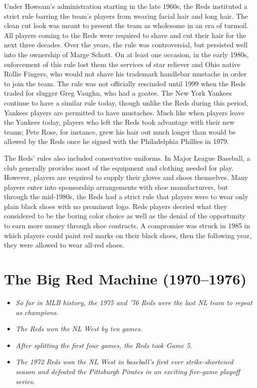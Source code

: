 Under Howsam's administration starting in the late 1960s, the Reds
instituted a strict rule barring the team's players from wearing facial
hair and long hair. The clean cut look was meant to present the team as
wholesome in an era of turmoil. All players coming to the Reds were
required to shave and cut their hair for the next three decades. Over
the years, the rule was controversial, but persisted well into the
ownership of Marge Schott. On at least one occasion, in the early 1980s,
enforcement of this rule lost them the services of star reliever and
Ohio native Rollie Fingers, who would not shave his trademark handlebar
mustache in order to join the team. The rule was not officially
rescinded until 1999 when the Reds traded for slugger Greg Vaughn, who
had a goatee. The New York Yankees continue to have a similar rule
today, though unlike the Reds during this period, Yankees players are
permitted to have mustaches. Much like when players leave the Yankees
today, players who left the Reds took advantage with their new teams;
Pete Rose, for instance, grew his hair out much longer than would be
allowed by the Reds once he signed with the Philadelphia Phillies in
1979.

The Reds' rules also included conservative uniforms. In Major League
Baseball, a club generally provides most of the equipment and clothing
needed for play. However, players are required to supply their gloves
and shoes themselves. Many players enter into sponsorship arrangements
with shoe manufacturers, but through the mid-1980s, the Reds had a
strict rule that players were to wear only plain black shoes with no
prominent logo. Reds players decried what they considered to be the
boring color choice as well as the denial of the opportunity to earn
more money through shoe contracts. A compromise was struck in 1985 in
which players could paint red marks on their black shoes, then the
following year, they were allowed to wear all-red shoes.

\section{The Big Red Machine
(1970--1976)}\label{the-big-red-machine-19701976}

\begin{itemize}
\item
  \emph{So far in MLB history, the 1975 and '76 Reds were the last NL
  team to repeat as champions.}
\item
  \emph{The Reds won the NL West by ten games.}
\item
  \emph{After splitting the first four games, the Reds took Game 5.}
\item
  \emph{The 1972 Reds won the NL West in baseball's first ever
  strike-shortened season and defeated the Pittsburgh Pirates in an
  exciting five-game playoff series.}
\end{itemize}

